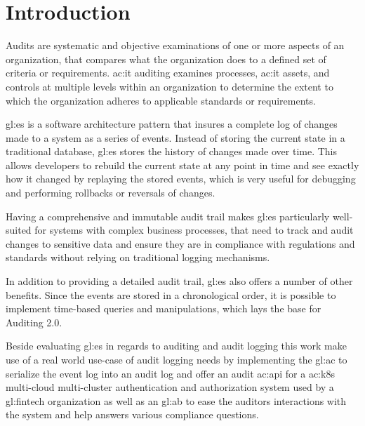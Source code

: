 %
\chapter{Introduction}

Audits are systematic and objective examinations of one or more aspects of an organization, that compares what the organization does to a defined set of criteria or requirements. \gls{ac:it} auditing examines processes, \gls{ac:it} assets, and controls at multiple levels within an organization to determine the extent to which the organization adheres to applicable standards or requirements. 

\gls{gl:es} is a software architecture pattern that insures a complete log of changes made to a system as a series of events. Instead of storing the current state in a traditional database, \gls{gl:es} stores the history of changes made over time. This allows developers to rebuild the current state at any point in time and see exactly how it changed by replaying the stored events, which is very useful for debugging and performing rollbacks or reversals of changes.

Having a comprehensive and immutable audit trail makes \gls{gl:es} particularly well-suited for systems with complex business processes, that need to track and audit changes to sensitive data and ensure they are in compliance with regulations and standards without relying on traditional logging mechanisms.

In addition to providing a detailed audit trail, \gls{gl:es} also offers a number of other benefits. Since the events are stored in a chronological order, it is possible to implement time-based queries and manipulations, which lays the base for Auditing 2.0.

Beside evaluating \gls{gl:es} in regards to auditing and audit logging this work make use of a real world use-case of audit logging needs by implementing the \gls{gl:ac} to serialize the event log into an audit log and offer an audit \gls{ac:api} for a \gls{ac:k8s} multi-cloud multi-cluster authentication and authorization system used by a \gls{gl:fintech} organization as well as an \gls{gl:ab} to ease the auditors interactions with the system and help answers various compliance questions.